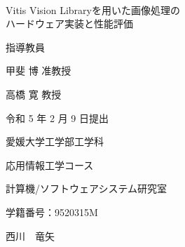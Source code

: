 \documentclass[11pt,a4j]{jreport}
\begin{document}
\thispagestyle{empty}
\begin{center}
\
\vspace{3cm}

{\huge{Vitis Vision Libraryを用いた画像処理の\\
ハードウェア実装と性能評価}}

\vspace{12mm}

{\LARGE 指導教員}

\vspace{6mm}

{\LARGE 甲斐 博 准教授}

\vspace{5mm}

{\LARGE 高橋 寛 教授}

\vspace{20mm}

{\LARGE 令和 5 年 2 月 9 日提出}\\

\vspace{20mm}

{\LARGE 愛媛大学工学部工学科}\\

\vspace{4mm}

{\LARGE 応用情報工学コース}\\

\vspace{4mm}

{\LARGE 計算機/ソフトウェアシステム研究室}\\

\vspace{4mm}

{\LARGE 学籍番号：9520315M}

\vspace{12mm}

{\huge 西川　竜矢}\\

\end{center}

\thispagestyle{empty}
\clearpage

\tableofcontents
\thispagestyle{empty}
\thispagestyle{empty}
\pagestyle{fancy}
\lhead{\rightmark}

\renewcommand{\chaptermark}[1]{\markboth{第\ \normalfont\thechapter\ 章~~#1}{}}

%
\end{document}
